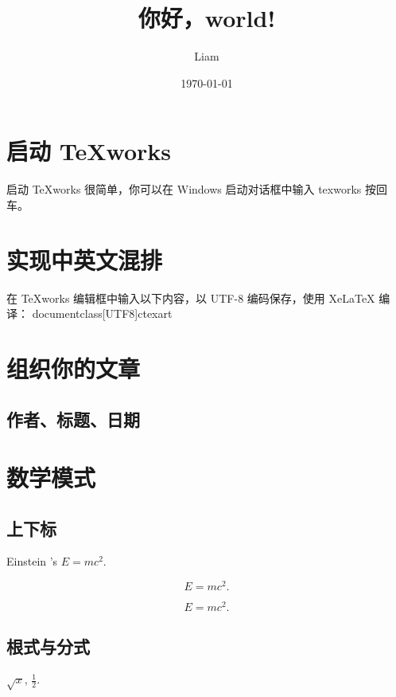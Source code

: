 \documentclass[UTF8]{ctexart}
\title{你好，world!}
\author{Liam}
\date{\today}
\begin{document}
\maketitle
\tableofcontents


\section{启动 TeXworks}
启动 TeXworks 很简单，你可以在 Windows 启动对话框中输入 texworks 按回车。

\section{实现中英文混排}
在 TeXworks 编辑框中输入以下内容，以 UTF-8 编码保存，使用 XeLaTeX 编译：
documentclass[UTF8]{ctexart}

\section{组织你的文章}

\subsection{作者、标题、日期}

\section{数学模式}
\subsection{ 上下标}
Einstein 's $E=mc^2$.

\[ E=mc^2. \]

\begin{equation}
E=mc^2.
\end{equation}

\subsection{ 根式与分式}

$\sqrt{x}$, $\frac{1}{2}$.
\end{document}
